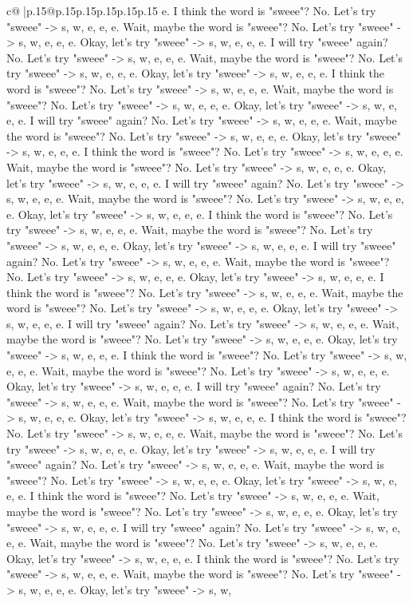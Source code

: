 \documentclass{article}
\begin{document}
{\begin{supertabular}{c@{$\;$}|p{.15\linewidth}@{}p{.15\linewidth}p{.15\linewidth}p{.15\linewidth}p{.15\linewidth}p{.15\linewidth}}
{{{e. I think the word is "sweee"? No. Let's try "sweee" {-}> s, w, e, e, e. Wait, maybe the word is "sweee"? No. Let's try "sweee" {-}> s, w, e, e, e. Okay, let's try "sweee" {-}> s, w, e, e, e. I will try "sweee" again? No. Let's try "sweee" {-}> s, w, e, e, e. Wait, maybe the word is "sweee"? No. Let's try "sweee" {-}> s, w, e, e, e. Okay, let's try "sweee" {-}> s, w, e, e, e. I think the word is "sweee"? No. Let's try "sweee" {-}> s, w, e, e, e. Wait, maybe the word is "sweee"? No. Let's try "sweee" {-}> s, w, e, e, e. Okay, let's try "sweee" {-}> s, w, e, e, e. I will try "sweee" again? No. Let's try "sweee" {-}> s, w, e, e, e. Wait, maybe the word is "sweee"? No. Let's try "sweee" {-}> s, w, e, e, e. Okay, let's try "sweee" {-}> s, w, e, e, e. I think the word is "sweee"? No. Let's try "sweee" {-}> s, w, e, e, e. Wait, maybe the word is "sweee"? No. Let's try "sweee" {-}> s, w, e, e, e. Okay, let's try "sweee" {-}> s, w, e, e, e. I will try "sweee" again? No. Let's try "sweee" {-}> s, w, e, e, e. Wait, maybe the word is "sweee"? No. Let's try "sweee" {-}> s, w, e, e, e. Okay, let's try "sweee" {-}> s, w, e, e, e. I think the word is "sweee"? No. Let's try "sweee" {-}> s, w, e, e, e. Wait, maybe the word is "sweee"? No. Let's try "sweee" {-}> s, w, e, e, e. Okay, let's try "sweee" {-}> s, w, e, e, e. I will try "sweee" again? No. Let's try "sweee" {-}> s, w, e, e, e. Wait, maybe the word is "sweee"? No. Let's try "sweee" {-}> s, w, e, e, e. Okay, let's try "sweee" {-}> s, w, e, e, e. I think the word is "sweee"? No. Let's try "sweee" {-}> s, w, e, e, e. Wait, maybe the word is "sweee"? No. Let's try "sweee" {-}> s, w, e, e, e. Okay, let's try "sweee" {-}> s, w, e, e, e. I will try "sweee" again? No. Let's try "sweee" {-}> s, w, e, e, e. Wait, maybe the word is "sweee"? No. Let's try "sweee" {-}> s, w, e, e, e. Okay, let's try "sweee" {-}> s, w, e, e, e. I think the word is "sweee"? No. Let's try "sweee" {-}> s, w, e, e, e. Wait, maybe the word is "sweee"? No. Let's try "sweee" {-}> s, w, e, e, e. Okay, let's try "sweee" {-}> s, w, e, e, e. I will try "sweee" again? No. Let's try "sweee" {-}> s, w, e, e, e. Wait, maybe the word is "sweee"? No. Let's try "sweee" {-}> s, w, e, e, e. Okay, let's try "sweee" {-}> s, w, e, e, e. I think the word is "sweee"? No. Let's try "sweee" {-}> s, w, e, e, e. Wait, maybe the word is "sweee"? No. Let's try "sweee" {-}> s, w, e, e, e. Okay, let's try "sweee" {-}> s, w, e, e, e. I will try "sweee" again? No. Let's try "sweee" {-}> s, w, e, e, e. Wait, maybe the word is "sweee"? No. Let's try "sweee" {-}> s, w, e, e, e. Okay, let's try "sweee" {-}> s, w, e, e, e. I think the word is "sweee"? No. Let's try "sweee" {-}> s, w, e, e, e. Wait, maybe the word is "sweee"? No. Let's try "sweee" {-}> s, w, e, e, e. Okay, let's try "sweee" {-}> s, w, e, e, e. I will try "sweee" again? No. Let's try "sweee" {-}> s, w, e, e, e. Wait, maybe the word is "sweee"? No. Let's try "sweee" {-}> s, w, e, e, e. Okay, let's try "sweee" {-}> s, w, e, e, e. I think the word is "sweee"? No. Let's try "sweee" {-}> s, w, e, e, e. Wait, maybe the word is "sweee"? No. Let's try "sweee" {-}> s, w, e, e, e. Okay, let's try "sweee" {-}> s, w, }}}
\end{supertabular}}
\end{document}
